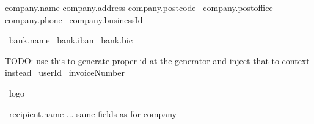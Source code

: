 {{ company.name }}
{{ company.address }}
{{ company.postcode }}
{{ company.postoffice }}
{{ company.phone }}
{{ company.businessId }}

{{ bank.name }}
{{ bank.iban }}
{{ bank.bic }}

TODO: use this to generate proper id at the generator and inject that to context instead
{{ userId }}
{{ invoiceNumber }}

{{ logo }}

{{ recipient.name }}
... same fields as for company

